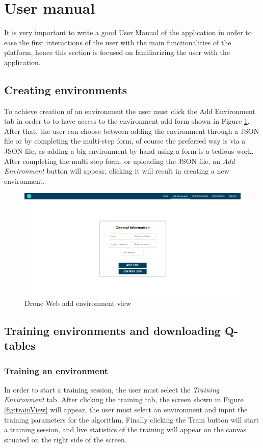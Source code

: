 \section{User manual}\label{userManual}
It is very important to write a good User Manual of the application in order to ease the first interactions of the user with the main functionalities of the platform, hence this section is focused on familiarizing the user with the application.

\subsection{Creating environments}
To achieve creation of an environment the user must click the Add Environment tab in order to to have access to the environment add form shown in Figure \ref{fig:addEnv}.
After that, the user can choose between adding the environment through a JSON file or by completing the multi-step form, of course the preferred way is via a JSON file, as adding a big environment by hand using a form is a tedious work. After completing the multi step form, or uploading the JSON file, an \emph{Add Environment} button will appear, clicking it will result in creating a new environment.


\begin{figure}[!htb]
    \centering
    \includegraphics[scale=0.22]{Figures/addEnvsView.png}
    \caption{Drone Web add environment view}
    \label{fig:addEnv}
\end{figure}

\subsection{Training environments and downloading Q-tables}
\subsubsection{Training an environment}
In order to start a training session, the user must select the \emph{Training Environment} tab. After clicking the training tab, the screen shown in Figure \ref{fig:trainView} will appear, the user must select an environment and input the training parameters for the algorithm. Finally clicking the Train button will start a training session, and live statistics of the training will appear on the canvas situated on the right side of the screen.

